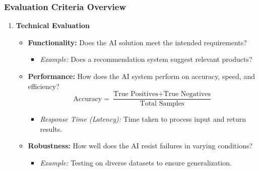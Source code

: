 \documentclass[aspectratio=169]{beamer}
\begin{document}
\begin{frame}[fragile]
    \frametitle{Evaluation Criteria Overview}
    \begin{enumerate}
        \item \textbf{Technical Evaluation}
            \begin{itemize}
                \item \textbf{Functionality:} Does the AI solution meet the intended requirements?
                    \begin{itemize}
                        \item \textit{Example:} Does a recommendation system suggest relevant products?
                    \end{itemize}
                \item \textbf{Performance:} How does the AI system perform on accuracy, speed, and efficiency?
                    \begin{equation}
                        \text{Accuracy} = \frac{\text{True Positives} + \text{True Negatives}}{\text{Total Samples}}
                    \end{equation}
                    \begin{itemize}
                        \item \textit{Response Time (Latency):} Time taken to process input and return results.
                    \end{itemize}
                \item \textbf{Robustness:} How well does the AI resist failures in varying conditions?
                    \begin{itemize}
                        \item \textit{Example:} Testing on diverse datasets to ensure generalization.
                    \end{itemize}
            \end{itemize}


\end{enumerate}
\end{frame}
\end{document}
